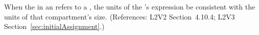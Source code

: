 When the  in an \InitialAssignment refers to a
\Compartment, the units of the \InitialAssignment's  expression
 be consistent with the units of that compartment's size.  (References:
L2V2 Section~4.10.4; L2V3 Section~\ref{sec:initialAssignment}.)
